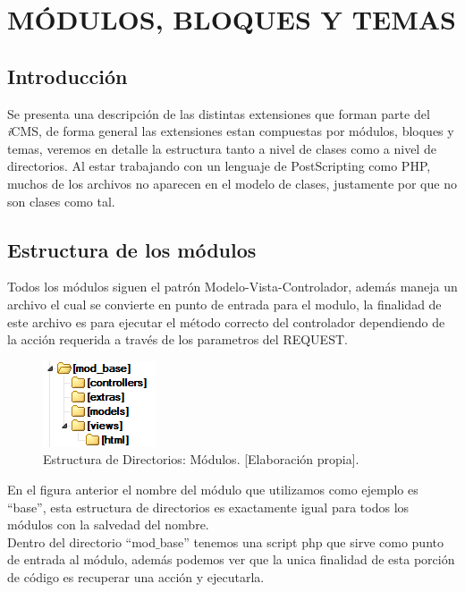 \chapter{M\'ODULOS, BLOQUES Y TEMAS}
\newpage
\section{Introducci\'on}
Se presenta una descripci\'on de las distintas extensiones que forman parte del \textit{i}CMS, de forma general las extensiones estan compuestas por m\'odulos, bloques y temas, veremos en detalle la estructura tanto a nivel de clases como a nivel de directorios. Al estar trabajando con un lenguaje de PostScripting como PHP, muchos de los archivos no aparecen en el modelo de clases, justamente por que no son clases como tal.

\section{Estructura de los m\'odulos}
Todos los m\'odulos siguen el patr\'on Modelo-Vista-Controlador, adem\'as maneja un archivo el cual se convierte en punto de entrada para el modulo, la finalidad de este archivo es para ejecutar el m\'etodo correcto del controlador dependiendo de la acci\'on requerida a trav\'es de los parametros del REQUEST.

\begin{figure}[h]
\centering
\includegraphics[scale=2, keepaspectratio=true]{imagenes/19_imagen.png}
\caption{Estructura de Directorios: M\'odulos. [Elaboraci\'on propia].}
\end{figure}

En el figura anterior el nombre del m\'odulo que utilizamos como ejemplo es ``base'', esta estructura de directorios es exactamente igual para todos los m\'odulos con la salvedad del nombre.\\
Dentro del directorio ``mod$\_$base'' tenemos una script php que sirve como punto de entrada al m\'odulo, adem\'as podemos ver que la unica finalidad de esta porci\'on de c\'odigo es recuperar una acci\'on y ejecutarla.\\




